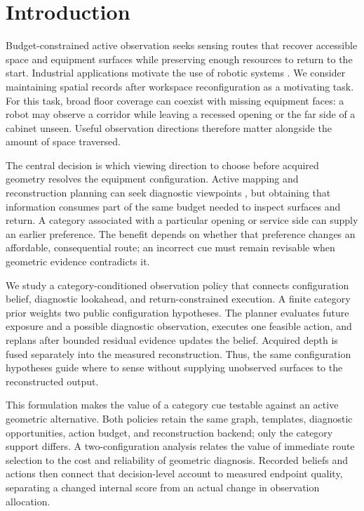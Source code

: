 \documentclass[11pt,a4paper]{article}
\providecommand{\hypertarget}[2]{#2}
\begin{document}
\hypertarget{introduction}{%
\section{Introduction}\label{introduction}}

Budget-constrained active observation seeks sensing routes that recover accessible space and equipment surfaces while preserving enough resources to return to the start. Industrial applications motivate the use of robotic systems \cite{ref9}. We consider maintaining spatial records after workspace reconfiguration as a motivating task. For this task, broad floor coverage can coexist with missing equipment faces: a robot may observe a corridor while leaving a recessed opening or the far side of a cabinet unseen. Useful observation directions therefore matter alongside the amount of space traversed.

The central decision is which viewing direction to choose before acquired geometry resolves the equipment configuration. Active mapping and reconstruction planning can seek diagnostic viewpoints \cite{ref10}, but obtaining that information consumes part of the same budget needed to inspect surfaces and return. A category associated with a particular opening or service side can supply an earlier preference. The benefit depends on whether that preference changes an affordable, consequential route; an incorrect cue must remain revisable when geometric evidence contradicts it.

We study a category-conditioned observation policy that connects configuration belief, diagnostic lookahead, and return-constrained execution. A finite category prior weights two public configuration hypotheses. The planner evaluates future exposure and a possible diagnostic observation, executes one feasible action, and replans after bounded residual evidence updates the belief. Acquired depth is fused separately into the measured reconstruction. Thus, the same configuration hypotheses guide where to sense without supplying unobserved surfaces to the reconstructed output.

This formulation makes the value of a category cue testable against an active geometric alternative. Both policies retain the same graph, templates, diagnostic opportunities, action budget, and reconstruction backend; only the category support differs. A two-configuration analysis relates the value of immediate route selection to the cost and reliability of geometric diagnosis. Recorded beliefs and actions then connect that decision-level account to measured endpoint quality, separating a changed internal score from an actual change in observation allocation.
\end{document}

